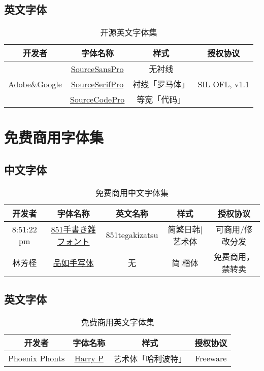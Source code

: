 \documentclass[11pt,a4paper,UTF8,titlepage]{ctexart} %
\begin{document}
    \clearpage
    \subsection{英文字体}
    \begin{table}[h]
        \centering \caption{开源英文字体集}
        \begin{tabular}{|*{4}{c|}}
            \hline
            开发者 & 字体名称 & 样式 & 授权协议 \\
            \hline
            \multirow{3}{*}{Adobe\&Google} & \href{https://github.com/adobe-fonts/source-sans-pro}{SourceSansPro} & 无衬线 & \multirow{3}{*}{SIL OFL, v1.1} \\
            \cline{2-3}
            & \href{https://github.com/adobe-fonts/source-serif-pro}{SourceSerifPro} & 衬线「罗马体」 & \\
            \cline{2-3}
            & \href{https://github.com/adobe-fonts/source-code-pro}{SourceCodePro} & 等宽「代码」 & \\
            \hline
        \end{tabular}
    \end{table}

    \section{免费商用字体集}
    \subsection{中文字体}
    \begin{table}[h]
    \centering \caption{免费商用中文字体集}
        \begin{tabular}{|*{5}{c|}}
            \hline
            开发者 & 字体名称 & 英文名称 & 样式 & 授权协议 \\
            \hline
            8:51:22 pm & \href{https://pm85122.onamae.jp/851fontpage.html}{851手書き雑フォント} & 851tegakizatsu & 简繁日韩|艺术体 & 可商用/修改分发 \\
            \hline
            林芳柽 & \href{https://www.zcool.com.cn/work/ZMjE0MjQyMDg=.html}{品如手写体} & 无 & 简|楷体 & 免费商用，禁转卖 \\
            \hline
        \end{tabular}
    \end{table}

    \subsection{英文字体}
    \begin{table}[h]
        \centering \caption{免费商用英文字体集}
        \begin{tabular}{|*{4}{c|}}
            \hline
            开发者 & 字体名称 & 样式 & 授权协议 \\
            \hline
            Phoenix Phonts & \href{https://www.fontspace.com/harry-p-font-f44342}{Harry P} & 艺术体「哈利波特」 & Freeware \\
            \hline
        \end{tabular}
    \end{table}
\end{document}
